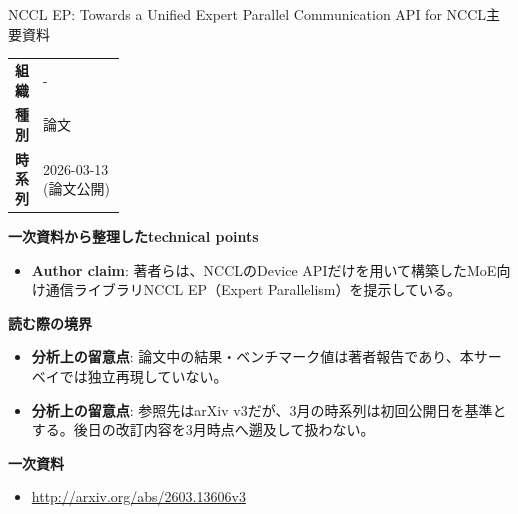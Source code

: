 \begin{technicalnote}{NCCL EP: Towards a Unified Expert Parallel Communication API for NCCL}{主要資料}
\begingroup
\begin{tabularx}{\linewidth}{@{}>{\bfseries}p{0.22\linewidth}X@{}}
組織 & - \\
種別 & 論文 \\
時系列 & 2026-03-13 (論文公開) \\
\end{tabularx}
\smallskip
{\bfseries 一次資料から整理したtechnical points}
\begin{itemize}[leftmargin=1.5em,itemsep=0.35em]
\item \textbf{Author claim}: 著者らは、NCCLのDevice APIだけを用いて構築したMoE向け通信ライブラリNCCL EP（Expert Parallelism）を提示している。
\end{itemize}
\begin{minipage}{\linewidth}
{\bfseries 読む際の境界}
\begin{itemize}[leftmargin=1.5em,itemsep=0.35em]
\item \textbf{分析上の留意点}: 論文中の結果・ベンチマーク値は著者報告であり、本サーベイでは独立再現していない。
\item \textbf{分析上の留意点}: 参照先はarXiv v3だが、3月の時系列は初回公開日を基準とする。後日の改訂内容を3月時点へ遡及して扱わない。
\end{itemize}
\begin{samepage}
{\bfseries 一次資料}
\begingroup\sloppy
\begin{itemize}[leftmargin=1.5em,itemsep=0.25em]
\item {\scriptsize\url{http://arxiv.org/abs/2603.13606v3}}
\end{itemize}
\endgroup
\end{samepage}
\end{minipage}
\endgroup
\end{technicalnote}
\medskip


